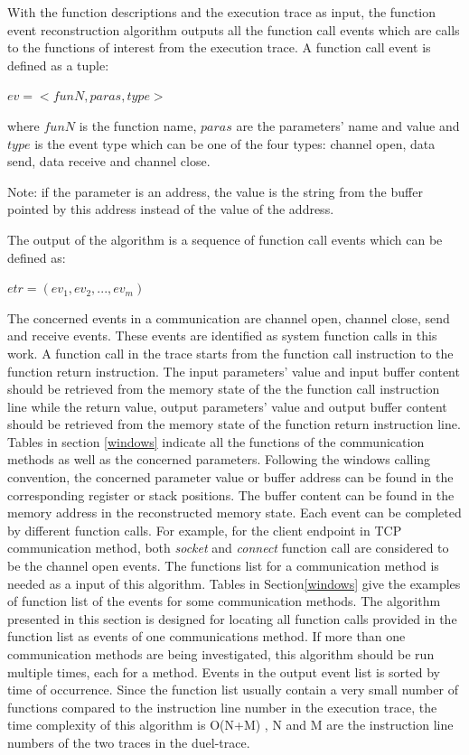 With the function descriptions and the execution trace as input, the function event reconstruction algorithm outputs all the function call events which are calls to the functions of interest from the execution trace. A function call event is defined as a tuple:

$ev = <funN, paras, type>$

where $funN$ is the function name, $paras$ are the parameters' name and value and $type$ is the event type which can be one of the four types: channel open, data send, data receive and channel close.

Note: if the parameter is an address, the value is the string from the buffer pointed by this address instead of the value of the address.

The output of the algorithm is a sequence of function call events which can be defined as:

$etr = (ev_1, ev_2, ..., ev_m)$


The concerned events in a communication are channel open, channel close, send and receive events. These events are identified as system function calls in this work.  A function call in the trace starts from the function call instruction to the function return instruction. The input parameters' value and input buffer content should be retrieved from the memory state of the the function call instruction line while the return value, output parameters' value and output buffer content should be retrieved from the memory state of the function return instruction line. Tables in section \ref{windows} indicate all the functions of the communication methods as well as the concerned parameters. Following the windows calling convention, the concerned parameter value or buffer address can be found in the corresponding register or stack positions. The buffer content can be found in the memory address in the reconstructed memory state. Each event can be completed by different function calls. For example, for the client endpoint in TCP communication method, both  \textit{socket} and \textit{connect} function call are considered to be the channel open events. The functions list for a communication method is needed as a input of this algorithm. Tables in Section\ref{windows} give the examples of function list of the events for some communication methods. The algorithm presented in this section is designed for locating all function calls provided in the function list as events of one communications method. If more than one communication methods are being investigated, this algorithm should be run multiple times, each for a method. Events in the output event list is sorted by time of occurrence. Since the function list usually contain a very small number of functions compared to the instruction line number in the execution trace, the time complexity of this algorithm is O(N+M) , N and M are the instruction line numbers of the two traces in the duel-trace.

